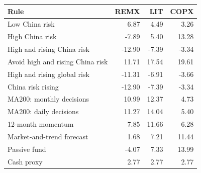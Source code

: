 \begin{tabular}{@{}lrrr@{}}
\toprule
Rule & REMX & LIT & COPX \\
\midrule
Low China risk & 6.87 & 4.49 & 3.26 \\
High China risk & -7.89 & 5.40 & 13.28 \\
High and rising China risk & -12.90 & -7.39 & -3.34 \\
Avoid high and rising China risk & 11.71 & 17.54 & 19.61 \\
High and rising global risk & -11.31 & -6.91 & -3.66 \\
China risk rising & -12.90 & -7.39 & -3.34 \\
MA200: monthly decisions & 10.99 & 12.37 & 4.73 \\
MA200: daily decisions & 11.27 & 14.04 & 5.40 \\
12-month momentum & 7.85 & 11.66 & 6.28 \\
Market-and-trend forecast & 1.68 & 7.21 & 11.44 \\
Passive fund & -4.07 & 7.33 & 13.99 \\
Cash proxy & 2.77 & 2.77 & 2.77 \\
\bottomrule
\end{tabular}